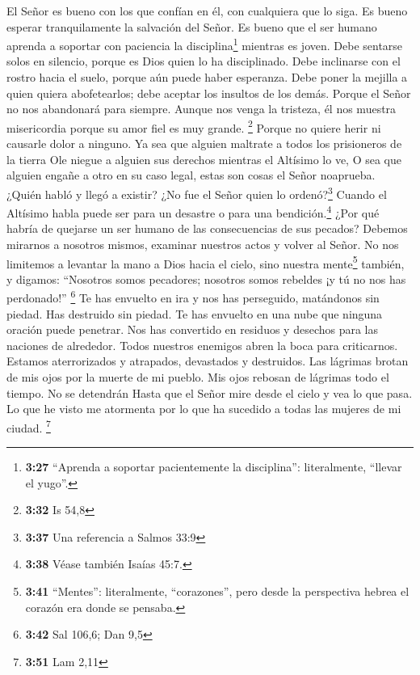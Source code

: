  El Señor es bueno con los que confían en él, con
cualquiera que lo siga.  Es bueno esperar tranquilamente
la salvación del Señor.  Es bueno que el ser humano
aprenda a soportar con paciencia la disciplina\footnote{\textbf{3:27}
  ``Aprenda a soportar pacientemente la disciplina'': literalmente,
  ``llevar el yugo''.} mientras es joven.  Debe sentarse
solos en silencio, porque es Dios quien lo ha disciplinado.
 Debe inclinarse con el rostro hacia el suelo, porque aún
puede haber esperanza.  Debe poner la mejilla a quien
quiera abofetearlos; debe aceptar los insultos de los demás.
 Porque el Señor no nos abandonará para siempre.
 Aunque nos venga la tristeza, él nos muestra
misericordia porque su amor fiel es muy grande. \footnote{\textbf{3:32}
  Is 54,8}  Porque no quiere herir ni causarle dolor a
ninguno.  Ya sea que alguien maltrate a todos los
prisioneros de la tierra  Ole niegue a alguien sus
derechos mientras el Altísimo lo ve,  O sea que alguien
engañe a otro en su caso legal, estas son cosas el Señor noaprueba.
 ¿Quién habló y llegó a existir? ¿No fue el Señor quien
lo ordenó?\footnote{\textbf{3:37} Una referencia a Salmos 33:9}
 Cuando el Altísimo habla puede ser para un desastre o
para una bendición.\footnote{\textbf{3:38} Véase también Isaías 45:7.}
 ¿Por qué habría de quejarse un ser humano de las
consecuencias de sus pecados?  Debemos mirarnos a
nosotros mismos, examinar nuestros actos y volver al Señor.
 No nos limitemos a levantar la mano a Dios hacia el
cielo, sino nuestra mente\footnote{\textbf{3:41} ``Mentes'':
  literalmente, ``corazones'', pero desde la perspectiva hebrea el
  corazón era donde se pensaba.} también, y digamos: 
``Nosotros somos pecadores; nosotros somos rebeldes ¡y tú no nos has
perdonado!'' \footnote{\textbf{3:42} Sal 106,6; Dan 9,5} 
Te has envuelto en ira y nos has perseguido, matándonos sin piedad. Has
destruido sin piedad.  Te has envuelto en una nube que
ninguna oración puede penetrar.  Nos has convertido en
residuos y desechos para las naciones de alrededor. 
Todos nuestros enemigos abren la boca para criticarnos. 
Estamos aterrorizados y atrapados, devastados y destruidos.
 Las lágrimas brotan de mis ojos por la muerte de mi
pueblo.  Mis ojos rebosan de lágrimas todo el tiempo. No
se detendrán  Hasta que el Señor mire desde el cielo y
vea lo que pasa.  Lo que he visto me atormenta por lo que
ha sucedido a todas las mujeres de mi ciudad. \footnote{\textbf{3:51}
  Lam 2,11}


